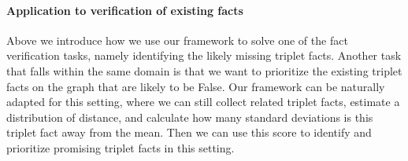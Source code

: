 \paragraph{Application to verification of existing facts}
Above we introduce how we use our framework to solve one of the fact verification tasks, namely identifying the likely missing triplet facts. Another task that falls within the same domain is that we want to prioritize the existing triplet facts on the graph that are likely to be False. Our framework can be naturally adapted for this setting, where we can still collect related triplet facts, estimate a distribution of distance, and calculate how many standard deviations is this triplet fact away from the mean. Then we can use this score to identify and prioritize promising triplet facts in this setting.